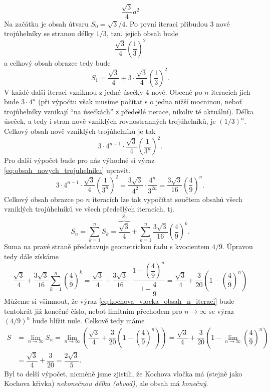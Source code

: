 \begin{equation*}
    \dfrac{\sqrt{3}}{4}a^2
\end{equation*}
Na začátku je obsah útvaru $S_0=\sqrt{3}/4$. Po první iteraci přibudou 3 nové trojúhelníky se stranou délky $1/3$, tzn. jejich obsah bude
\begin{equation*}
    \dfrac{\sqrt{3}}{4}\left(\dfrac{1}{3}\right)^2
\end{equation*}
a celkový obsah obrazce tedy bude
\begin{equation*}
    S_1=\dfrac{\sqrt{3}}{4}+3\cdot\dfrac{\sqrt{3}}{4}\left(\dfrac{1}{3}\right)^2.
\end{equation*}
V každé další iteraci vzniknou z jedné úsečky 4 nové. Obecně po $n$ iteracích jich bude $3\cdot 4^n$ (při výpočtu však musíme počítat s o jedna nižší mocninou, neboť trojúhelníky vznikají ``na úsečkách'' z předešlé iterace, nikoliv té aktuální). Délka úseček, a tedy i stran nově vzniklých rovnostranných trojúhelníků, je $(1/3)^n$. Celkový obsah nově vzniklých trojúhelníků je tak
\begin{equation*}\label{eq:obsah_novych_trojuhelniku}
    3\cdot 4^{n-1}\cdot\dfrac{\sqrt{3}}{4}\left(\dfrac{1}{3^n}\right)^2.
\end{equation*}
Pro další výpočet bude pro nás výhodné si výraz \eqref{eq:obsah_novych_trojuhelniku} upravit.
\begin{equation*}
    3\cdot 4^{n-1}\cdot\dfrac{\sqrt{3}}{4}\left(\dfrac{1}{3^n}\right)^2=\dfrac{3\sqrt{3}}{4^2}\cdot \dfrac{4^n}{3^{2n}}=\dfrac{3\sqrt{3}}{16}\left(\dfrac{4}{9}\right)^n.
\end{equation*}
Celkový obsah obrazce po $n$ iteracích lze tak vypočítat součtem obsahů všech vzniklých trojúhelníků ve všech předešlých iteracích, tj.
\begin{equation*}
    S_n=\sum_{k=1}^n{S_k}=\overbrace{\dfrac{\sqrt{3}}{4}}^{S_0}+\sum_{k=1}^n{\dfrac{3\sqrt{3}}{16}\left(\dfrac{4}{9}\right)^k}.
\end{equation*}
Suma na pravé straně představuje geometrickou řadu s kvocientem $4/9$. Úpravou tedy dále získáme
\begin{equation*}\label{eq:kochova_vlocka_obsah_n_iteraci}
    \dfrac{\sqrt{3}}{4}+\dfrac{3\sqrt{3}}{16}\sum_{k=1}^n{\left(\dfrac{4}{9}\right)^k}=\dfrac{\sqrt{3}}{4}+\dfrac{3\sqrt{3}}{16}\cdot\dfrac{1-\left(\dfrac{4}{9}\right)^n}{1-\dfrac{4}{9}}=\dfrac{\sqrt{3}}{4}+\dfrac{3}{20}\left(1-\left(\dfrac{4}{9}\right)^n\right)
\end{equation*}
Můžeme si všimnout, že výraz \eqref{eq:kochova_vlocka_obsah_n_iteraci} bude tentokrát již konečné číslo, neboť limitním přechodem pro $n\to\infty$ se výraz $(4/9)^n$ bude blížit nule. Celkově tedy máme
\begin{align*}
    S&=\lim_{n\to\infty}S_n=\lim_{n\to\infty}\left(\dfrac{\sqrt{3}}{4}+\dfrac{3}{20}\left(1-\left(\dfrac{4}{9}\right)^n\right)\right)=\dfrac{\sqrt{3}}{4}+\dfrac{3}{20}\left(1-\lim_{n\to\infty}\left(\dfrac{4}{9}\right)^n\right)\\
    &=\dfrac{\sqrt{3}}{4}+\dfrac{3}{20}=\dfrac{2\sqrt{3}}{5}.
\end{align*}
Byl to delší výpočet, nicméně jsme zjistili, že Kochova vločka má (stejně jako Kochova křivka) \emph{nekonečnou délku (obvod)}, ale obsah má \emph{konečný}.